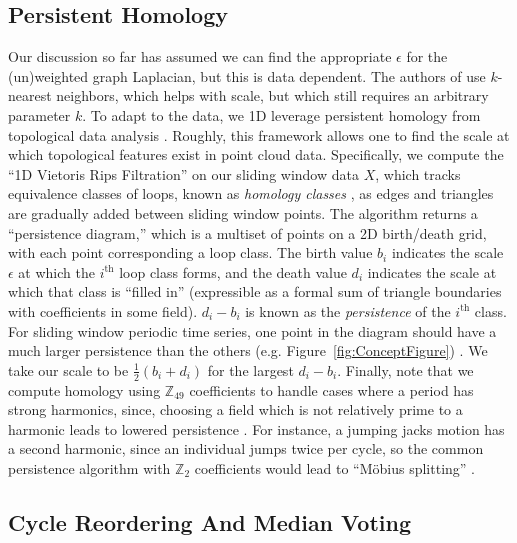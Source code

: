 \documentclass{article}
\begin{document}
\subsection{Persistent Homology}
Our discussion so far has assumed we can find the appropriate $\epsilon$ for the (un)weighted graph Laplacian, but this is data dependent.  The authors of \cite{averbuch2015ringit} use $k$-nearest neighbors, which helps with scale, but which still requires an arbitrary parameter $k$.  To adapt to the data, we 1D leverage persistent homology from topological data analysis \cite{edelsbrunner2010computational}.  Roughly, this framework allows one to find the scale at which topological features exist in point cloud data.  Specifically, we compute the ``1D Vietoris Rips Filtration'' on our sliding window data $X$, which tracks equivalence classes of loops, known as {\em homology classes} \cite{Hatcher}, as edges and triangles are gradually added between sliding window points.  The algorithm returns a ``persistence diagram,'' which is a multiset of points on a 2D birth/death grid, with each point corresponding a loop class.  The birth value $b_i$ indicates the scale $\epsilon$ at which the $i^{\text{th}}$ loop class forms, and the death value $d_i$ indicates the scale at which that class is ``filled in'' (expressible as a formal sum of triangle boundaries with coefficients in some field).  $d_i - b_i$ is known as the {\em persistence} of the $i^{\text{th}}$ class.  For sliding window periodic time series, one point in the diagram should have a much larger persistence than the others (e.g. Figure~\ref{fig:ConceptFigure}) \cite{perea2015sliding,tralie2017quasi}.  We take our scale to be $\frac{1}{2}(b_i + d_i)$ for the largest $d_i - b_i$.  
Finally, note that we compute homology using $\mathbb{Z}_{49}$ coefficients to handle cases where a period has strong harmonics, since, choosing a field which is not relatively prime to a harmonic leads to lowered persistence \cite{perea2015sliding, traliemoebius}.  For instance, a jumping jacks motion has a second harmonic, since an individual jumps twice per cycle, so the common persistence algorithm with $\mathbb{Z}_2$ coefficients would lead to ``M{\"o}bius splitting'' \cite{traliemoebius}.

\subsection{Cycle Reordering And Median Voting}
\label{sec:cyclereordering}
\end{document}

